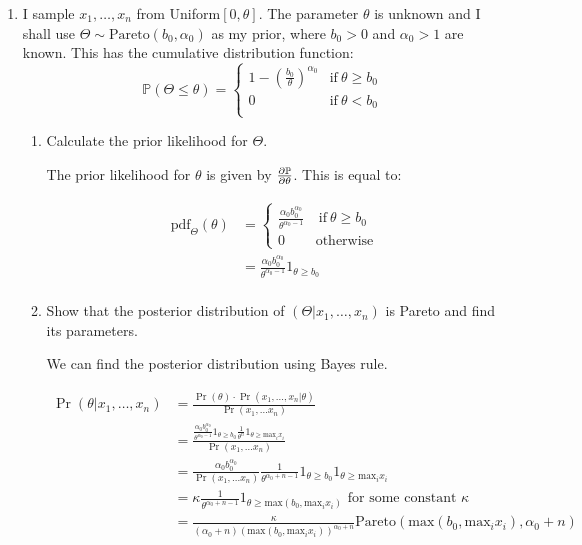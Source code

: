 \documentclass[10pt,\jkfside,a4paper]{article}
\begin{document}
\begin{enumerate}
\fi

\item I sample $x_1, \dots, x_n$ from Uniform$[0, \theta]$. The parameter
$\theta$ is unknown and I shall use $\Theta \sim \text{Pareto}(b_0,
\alpha_0)$ as my prior, where $b_0 > 0$ and $\alpha_0 > 1$ are known. This
has the cumulative distribution function:
\[
\mathbb{P}(\Theta \leq \theta) =
\begin{cases}
1 - \left( \frac{b_0}{\theta} \right)^{\alpha_0} & \text{if} \ \theta \geq
b_0 \\
0 & \text{if} \ \theta < b_0 \\
\end{cases}
\]

\begin{enumerate}[label=(\alph*)]

\item Calculate the prior likelihood for $\Theta$.

The prior likelihood for $\theta$ is given by $\pdv{\mathbb{P}}{\theta}$.
This is equal to:

\[
\begin{split}
\text{pdf}_{\Theta}(\theta) &=
\begin{cases}
\frac{\alpha_0 b_0^{\alpha_0}}{\theta^{\alpha_0 - 1}} & \ \text{if} \ \theta
\geq b_0 \\
0 & \text{otherwise}
\end{cases} \\
&= \frac{\alpha_0 b_0^{\alpha_0}}{\theta^{\alpha_0 - 1}}1_{\theta \geq b_0} \\
\end{split}
\]

\item Show that the posterior distribution of $(\Theta | x_1, \dots, x_n)$
is Pareto and find its parameters.

We can find the posterior distribution using Bayes rule.

\[
\begin{split}
\Pr(\theta | x_1, \dots, x_n)
&= \frac{\Pr\left(\theta\right) \cdot \Pr\left(x_1, \dots, x_n | \theta\right)
}{\Pr(x_1, \dots x_n)} \\
&= \frac{\frac{\alpha_0 b_0^{\alpha_0}}{\theta^{\alpha_0 - 1}}1_{\theta \geq
b_0} \frac{1}{\theta^n}1_{\theta \geq \text{max}_i x_i}}{\Pr(x_1, \dots x_n)} \\
&= \frac{\alpha_0 b_0^{\alpha_0}}{\Pr(x_1, \dots x_n)
}\frac{1}{\theta^{\alpha_0 + n- 1}}1_{\theta
\geq b_0}1_{\theta \geq \text{max}_i x_i}\\
&= \kappa \frac{1}{\theta^{\alpha_0 + n- 1}}1_{\theta
\geq \text{max}\left(b_0, \text{max}_i x_i\right)} \text{ for some constant }
\kappa \\
&= \frac{\kappa}{\left( \alpha_0 + n \right)(\text{max}\left(b_0, \text{max}_i x_i\right))^{\alpha_0 + n}}
\text{Pareto}(\text{max}\left(b_0, \text{max}_i x_i\right), \alpha_0 + n) \\
\end{split}
\]


\end{enumerate}
\end{enumerate}
\end{document}
